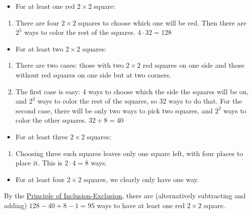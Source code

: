 \begin{enumerate}
 
            \begin{itemize}
        \item For at least one red $2 \times 2$ square:
            \end{itemize}
            
            \begin{enumerate}[label=(\roman*)]
                \item There are four $2 \times 2$ squares to choose which one will be red. Then there are $2^5$ ways to color the rest of the squares. $4 \cdot 32=128$
            \end{enumerate}
            
            \begin{itemize}
        \item For at least two $2 \times 2$ squares:
            \end{itemize}
            
            \begin{enumerate}[label=(\roman*)]
                \item There are two cases: those with two $2 \times 2$ red squares on one side and those without red squares on one side but at two corners.\item The first case is easy: 4 ways to choose which the side the squares will be on, and $2^3$ ways to color the rest of the squares, so 32 ways to do that. For the second case, there will be only two ways to pick two squares, and $2^2$ ways to color the other squares. $32+8=40$
            \end{enumerate}
            
            \begin{itemize}
        \item For at least three $2 \times 2$ squares:
            \end{itemize}
            
            \begin{enumerate}[label=(\roman*)]
                \item Choosing three such squares leaves only one square left, with four places to place it. This is $2 \cdot 4 = 8$ ways.
            \end{enumerate}
            
            \begin{itemize}
        \item For at least four $2 \times 2$ squares, we clearly only have one way.
            \end{itemize}
            By the \href{https://artofproblemsolving.com/wiki/index.php?title=Principle\_of\_Inclusion-Exclusion}{Principle of Inclusion-Exclusion}, there are (alternatively subtracting and adding) $128-40+8-1=95$ ways to have at least one red $2 \times 2$ square.


\end{enumerate}
